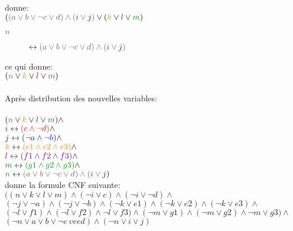 donne:\\
$(\cgris{(a \vee b \vee \neg c \vee d) \wedge (\crouge{i} \vee \cblue{j})} \vee (\corange{k} \vee \cviolet{l}\vee \cvert{m})$\\

\begin{description}
\item[$\cgris{n}$] $\leftrightarrow \cgris{(a \vee b \vee \neg c \vee d) \wedge (\crouge{i} \vee \cblue{j})}$
\end{description}

ce qui donne:\\
$(\cgris{n} \vee \corange{k} \vee \cviolet{l}\vee \cvert{m})$\\

\pagebreak
\ \\
Après distribution des nouvelles variables:\\
\ \\
$(\cgris{n} \vee \corange{k} \vee \cviolet{l}\vee \cvert{m}) \wedge $\\
$\textcolor{red}{i} \leftrightarrow \textcolor{red}{(c \wedge \neg d)} \wedge $\\ 
$\textcolor{blue}{j} \leftrightarrow \textcolor{blue}{(\neg a \wedge \neg b)} \wedge $\\
$\textcolor{orange}{k} \leftrightarrow \textcolor{orange}{(e1 \wedge e2 \wedge e3)} \wedge $\\
$\textcolor{violet}{l} \leftrightarrow \textcolor{violet}{(f1 \wedge f2 \wedge f3)} \wedge $\\
$\cvert{m} \leftrightarrow \cvert{(g1 \wedge g2 \wedge g3)} \wedge $\\
$\cgris{n} \leftrightarrow \cgris{(a \vee b \vee \neg c \vee d) \wedge (\crouge{i} \vee \cblue{j}})$
\\

donne la formule CNF suivante:\\
$((n \vee k \vee l \vee m)\wedge (\neg i \vee c)\wedge (\neg i \vee \neg d)\wedge$\\
$(\neg j \vee \neg a)\wedge(\neg j \vee \neg b)\wedge(\neg k \vee e1)\wedge(\neg k \vee e2)\wedge(\neg k \vee e3)\wedge$\\
$(\neg l \vee f1)\wedge(\neg l \vee f2)\wedge\neg l \vee f3)\wedge(\neg m \vee g1)\wedge(\neg m \vee g2)\wedge\neg m \vee g3)\wedge$\\
$(\neg n \vee a \vee b \vee \neg c \ vee d)\wedge(\neg n \vee i \vee j)$\\




\pagebreak